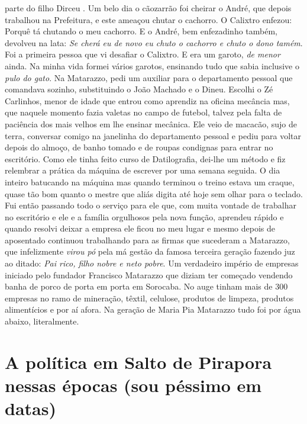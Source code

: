 \documentclass[12pt,brazil,]{book}
\begin{document}
parte do filho Dirceu . Um belo dia o cãozarrão foi cheirar o André, que
depois trabalhou na Prefeitura, e este ameaçou chutar o cachorro. O
Calixtro enfezou: Porquê tá chutando o meu cachorro. E o André, bem
enfezadinho também, devolveu na lata: \emph{Se cherá eu de novo eu chuto
o cachorro e chuto o dono tamém}. Foi a primeira pessoa que vi desafiar
o Calixtro. E era um garoto, \emph{de menor} ainda. Na minha vida formei
vários garotos, ensinando tudo que sabia inclusive o \emph{pulo do
gato}. Na Matarazzo, pedi um auxiliar para o departamento pessoal que
comandava sozinho, substituindo o João Machado e o Dineu. Escolhi o Zé
Carlinhos, menor de idade que entrou como aprendiz na oficina mecância
mas, que naquele momento fazia valetas no campo de futebol, talvez pela
falta de paciência dos mais velhos em lhe ensinar mecânica. Ele veio de
macacão, sujo de terra, conversar comigo na janelinha do departamento
pessoal e pediu para voltar depois do almoço, de banho tomado e de
roupas condignas para entrar no escritório. Como ele tinha feito curso
de Datilografia, dei-lhe um método e fiz relembrar a prática da máquina
de escrever por uma semana seguida. O dia inteiro batucando na máquina
mas quando terminou o treino estava um craque, quase tão bom quanto o
mestre que aliás digita até hoje sem olhar para o teclado. Fui então
passando todo o serviço para ele que, com muita vontade de trabalhar no
escritório e ele e a família orgulhosos pela nova função, aprendeu
rápido e quando resolvi deixar a empresa ele ficou no meu lugar e mesmo
depois de aposentado continuou trabalhando para as firmas que sucederam
a Matarazzo, que infelizmente \emph{virou pó} pela má gestão da famosa
terceira geração fazendo juz ao ditado: \emph{Pai rico, filho nobre e
neto pobre}. Um verdadeiro império de empresas iniciado pelo fundador
Francisco Matarazzo que diziam ter começado vendendo banha de porco de
porta em porta em Sorocaba. No auge tinham mais de 300 empresas no ramo
de mineração, têxtil, celulose, produtos de limpeza, produtos
alimentícios e por aí afora. Na geração de Maria Pia Matarazzo tudo foi
por água abaixo, literalmente.

\section{A política em Salto de Pirapora nessas épocas (sou péssimo em
datas)}\label{a-poluxedtica-em-salto-de-pirapora-nessas-uxe9pocas-sou-puxe9ssimo-em-datas}
\end{document}

